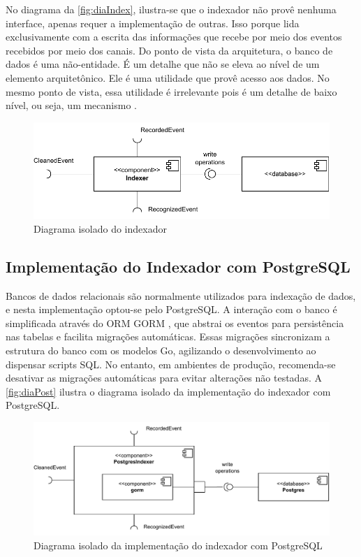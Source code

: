 \documentclass[12pt, %
openright, 
oneside, %
a4paper,    %
brazil]{facom-ufu-abntex2}
\begin{document}
No diagrama da \autoref{fig:diaIndex}, ilustra-se que o indexador não provê
nenhuma interface, apenas requer a implementação de outras. Isso porque lida
exclusivamente com a escrita das informações que recebe por meio dos eventos
recebidos por meio dos canais.						Do
ponto de vista da arquitetura, o banco de dados é uma não-entidade. É um
detalhe que não se eleva ao nível de um elemento arquitetônico. Ele é uma
utilidade que provê acesso aos dados. No mesmo ponto de vista, essa utilidade é
irrelevante pois é um detalhe de baixo nível, ou seja, um mecanismo
\cite{martin2018clean}. %

\begin{figure}[!ht]
	\centering
	\includegraphics[width=0.8\linewidth]{indexer.pdf}
	\caption[Diagrama isolado do indexador]{Diagrama isolado do indexador}
	\label{fig:diaIndex}
\end{figure}

\subsection{Implementação do Indexador com PostgreSQL}

Bancos de dados relacionais são normalmente utilizados para indexação de dados,
e nesta implementação optou-se pelo PostgreSQL. A interação com o banco é
simplificada através do ORM GORM \cite{gorm}, que abstrai os eventos para
persistência nas tabelas e facilita migrações automáticas. Essas migrações
sincronizam a estrutura do banco com os modelos Go, agilizando o
desenvolvimento ao dispensar scripts SQL. No entanto, em ambientes de produção,
recomenda-se desativar as migrações automáticas para evitar alterações não
testadas. A \autoref{fig:diaPost} ilustra o diagrama isolado da implementação
do indexador com PostgreSQL.

\begin{figure}[!ht]
	\centering
	\includegraphics[width=1\linewidth]{postgres_indexer.pdf}
	\caption[Diagrama isolado da implementação do indexador com
		PostgreSQL]{Diagrama isolado da implementação do indexador com PostgreSQL}
	\label{fig:diaPost}
\end{figure}
\end{document}
